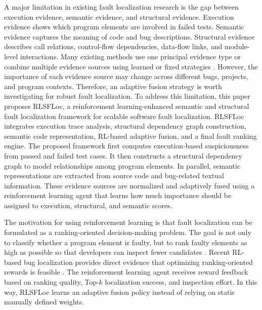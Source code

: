 \documentclass[article,article,submit,pdftex,moreauthors]{Definitions/mdpi}
\begin{document}
A major limitation in existing fault localization research is the gap between execution evidence, semantic evidence, and structural evidence. Execution evidence shows which program elements are involved in failed tests. Semantic evidence captures the meaning of code and bug descriptions. Structural evidence describes call relations, control-flow dependencies, data-flow links, and module-level interactions. Many existing methods use one principal evidence type or combine multiple evidence sources using learned or fixed strategies \cite{xuan2014learning,sohn2017fluccs,le2016ltr,lou2021grace,zeng2022smartfl,yan2023propagation}. However, the importance of each evidence source may change across different bugs, projects, and program contexts. Therefore, an adaptive fusion strategy is worth investigating for robust fault localization. To address this limitation, this paper proposes RLSFLoc, a reinforcement learning-enhanced semantic and structural fault localization framework for scalable software fault localization. RLSFLoc integrates execution trace analysis, structural dependency graph construction, semantic code representation, RL-based adaptive fusion, and a final fault ranking engine. The proposed framework first computes execution-based suspiciousness from passed and failed test cases. It then constructs a structural dependency graph to model relationships among program elements. In parallel, semantic representations are extracted from source code and bug-related textual information. These evidence sources are normalized and adaptively fused using a reinforcement learning agent that learns how much importance should be assigned to execution, structural, and semantic scores.

The motivation for using reinforcement learning is that fault localization can be formulated as a ranking-oriented decision-making problem. The goal is not only to classify whether a program element is faulty, but to rank faulty elements as high as possible so that developers can inspect fewer candidates \cite{parnin2011debugging,kochhar2016practitioners}. Recent RL-based bug localization provides direct evidence that optimizing ranking-oriented rewards is feasible \cite{chakraborty2024rlocator}. The reinforcement learning agent receives reward feedback based on ranking quality, Top-$k$ localization success, and inspection effort. In this way, RLSFLoc learns an adaptive fusion policy instead of relying on static manually defined weights.
\end{document}
